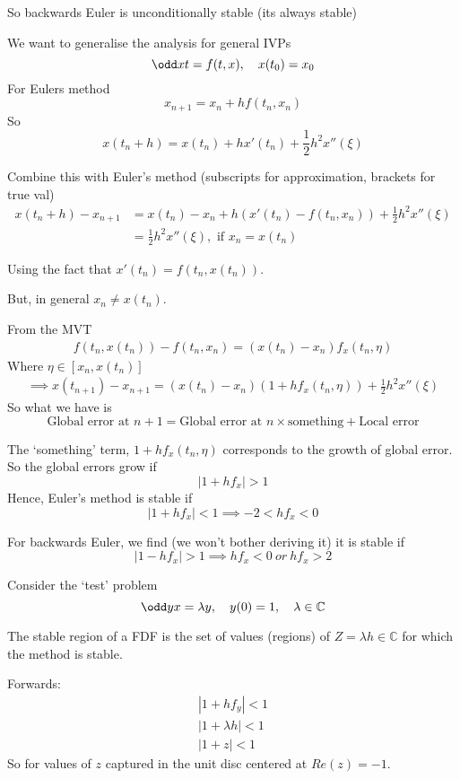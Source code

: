 \documentclass{X:/Documents/Coding/Latex/myassignment}
\begin{document}
So backwards Euler is unconditionally stable (its always stable)




We want to generalise the analysis for general IVPs
\[\odd xt = f(t,x), \quad x(t_0) = x_0\]
For Eulers method
\[x_{n+1} = x_n + hf(t_n,x_n)\]
So
\[x(t_n + h) = x(t_n) + hx'(t_n) + \frac12 h^2 x''(\xi)\]

Combine this with Euler's method (subscripts for approximation, brackets for true val)
\begin{align*}
    x(t_n+h) - x_{n+1} &= x(t_n) - x_n +h(x'(t_n) - f(t_n,x_n)) + \frac12 h^2 x''(\xi)\\
    &= \frac12 h^2 x''(\xi), \text{ if } x_n = x(t_n)
\end{align*}

Using the fact that $x'(t_n) = f(t_n,x(t_n))$.

But, in general $x_n \neq x(t_n)$.

From the MVT
\begin{align*}
    f(t_n,x(t_n)) - f(t_n,x_n) = (x(t_n) - x_n)f_x(t_n,\eta)
\end{align*}
Where $\eta \in [x_n,x(t_n)]$
\begin{align*}
    \implies x(t_{n+1}) - x_{n+1} = \left(x(t_n) - x_n\right)(1 + h f_x(t_n,\eta)) + \frac12 h^2 x''(\xi)
\end{align*}
So what we have is 
\[\text{Global error at } n+1 = \text{Global error at }n\times\text{something} + \text{Local error}\]

The `something' term, $1+hf_x(t_n,\eta)$ corresponds to the growth of global error. So the global errors grow if
\[|1+hf_x| > 1\]
Hence, Euler's method is stable if
\[|1+hf_x| < 1 \implies -2 < hf_x < 0\]


For backwards Euler, we find (we won't bother deriving it) it is stable if
\[|1-hf_x| > 1 \implies hf_x < 0 \ or \ hf_x > 2\]


Consider the `test' problem
\[\odd yx = \lambda y, \quad y(0) = 1, \quad \lambda \in \mathbb{C}\]

The stable region of a FDF is the set of values (regions) of $Z = \lambda h\in \mathbb{C}$ for which the method is stable.

Forwards:
\begin{align*}
  |1 + hf_y|< 1\\
  |1+\lambda h| < 1\\
  |1 + z| < 1  
\end{align*}
So for values of $z$ captured in the unit disc centered at $Re(z)=-1$. 
\end{document}
